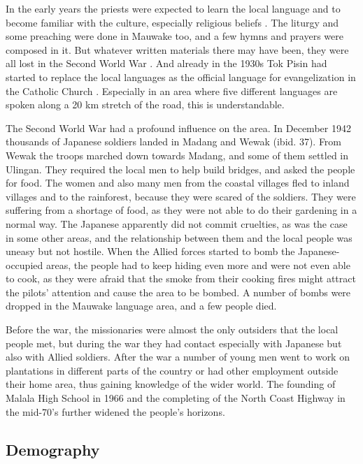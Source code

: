 In the early years the priests were expected to learn the local language and to become familiar with the culture, especially religious beliefs \citep[25]{BrummEtAl1995}%
. The liturgy and some preaching were done in Mauwake too, and a few hymns and prayers were composed in it. But whatever written materials there may have been, they were all lost in the Second World War \citep[3--4]{ZGraggen1971}.  And already in the 1930s Tok Pisin had started to replace the local languages as the official language for evangelization in the Catholic Church \citep[179]{BrummEtAl1995}%
.  Especially in an area where five different languages are spoken along a 20 km stretch of the road, this is understandable.  

The Second World War had a profound influence on the area.  In December 1942 thousands of Japanese soldiers landed in Madang and Wewak (ibid. 37).  From Wewak the troops marched down towards Madang, and some of them settled in Ulingan.  They required the local men to help build bridges, and asked the people for food.  The women and also many men from the coastal villages fled to inland villages and to the rainforest, because they were scared of the soldiers.  They were suffering from a shortage of food, as they were not able to do their gardening in a normal way.  The Japanese apparently did not commit cruelties, as was the case in some other areas, and the relationship between them and the local people was uneasy but not hostile. When the Allied forces started to bomb the Japanese-occupied areas, the people had to keep hiding even more and were not even able to cook, as they were afraid that the smoke from their cooking fires might attract the pilots' attention and cause the area to be bombed.  A number of bombs were dropped in the Mauwake language area, and a few people died. 

Before the war, the missionaries were almost the only outsiders that the local people met, but during the war they had contact especially with Japanese but also with Allied soldiers.  After the war a number of young men went to work on plantations in different parts of the country or had other employment outside their home area, thus gaining knowledge of the wider world. The founding of Malala High School in 1966 and the completing of the North Coast Highway in the mid-70's further widened the people's horizons.

\subsection{Demography}   \label{sec:1.3.3} 


